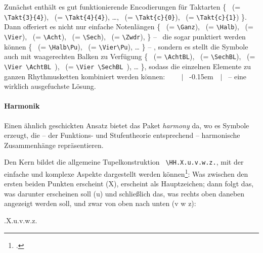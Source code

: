 Zunächst enthält es gut funktionierende Encodierungen für Taktarten \{ 
 \ (= \texttt{\small \textbackslash{Takt}\{3\}\{4\}}),
 \ (= \texttt{\small \textbackslash{Takt}\{4\}\{4\}}),
\ldots,
 \ (= \texttt{\small \textbackslash{Takt}\{c\}\{0\}}),
 \ (= \texttt{\small \textbackslash{Takt}\{c\}\{1\}})
\}.
Dann offeriert es nicht nur einfache Notenlängen \{
\Ganz \ (= \texttt{\small \textbackslash{Ganz}}),
\Halb \ (= \texttt{\small \textbackslash{Halb}}),
\Vier \ (= \texttt{\small \textbackslash{Vier}}),
\Acht \ (= \texttt{\small \textbackslash{Acht}}),
\Sech \ (= \texttt{\small \textbackslash{Sech}}),
\Zwdr \ (= \texttt{\small \textbackslash{Zwdr}}),
\}  -- \ die sogar punktiert werden können 
\{
\Halb\Pu \ (= \texttt{\small \textbackslash{Halb}\textbackslash{Pu}}),
\Vier\Pu \ (= \texttt{\small \textbackslash{Vier}\textbackslash{Pu}}),
\ldots
\}
-- ,
sondern es stellt die Symbole auch mit waagerechten Balken zu Verfügung
\{
\AchtBL \ (= \texttt{\small \textbackslash{AchtBL}}),
\SechBL \ (= \texttt{\small \textbackslash{SechBL}}),
\Vier\AchtBL \ (= \texttt{\small \textbackslash{Vier} \textbackslash{AchtBL} }),
\Vier\SechBL \ (= \texttt{\small \textbackslash{Vier} \textbackslash{SechBL} }),
\ldots
\}, 
sodass die einzelnen Elemente zu ganzen Rhythmusketten kombiniert werden können: 
 \Vier \ \Vier\AchtBL \ \Vier\Pu \ \Acht \ $|$ 
\AchtBR\Pu \SechBl \ \AchtBR\kern-0.15em\SechBR\Vier \ \SechBr\Vier\SechBl \ $|$
\ -- eine wirklich ausgefuchste Lösung.

\paragraph{\small Harmonik}$\;$ \\

Einen ähnlich geschickten Ansatz bietet das Paket \textit{harmony} da, wo es
Symbole erzeugt, die -- der Funktions- und Stufentheorie entsprechend --
harmonische Zusammenhänge repräsentieren.

Den Kern bildet die allgemeine Tupelkonstruktion \texttt{\small
\textbackslash{HH.X.u.v.w.z.}}, mit der einfache und komplexe Aspekte
dargestellt werden können\footcite[vgl. dazu][2ff]{WegWeg2007a}: Was zwischen
den ersten beiden Punkten erscheint (X), erscheint als Hauptzeichen; dann folgt
das, was darunter erscheinen soll (u) und schließlich das, was rechts oben
daneben angezeigt werden soll, und zwar von oben nach unten (v w z):

\begin{center}
\HH.X.u.v.w.z.
\end{center}


